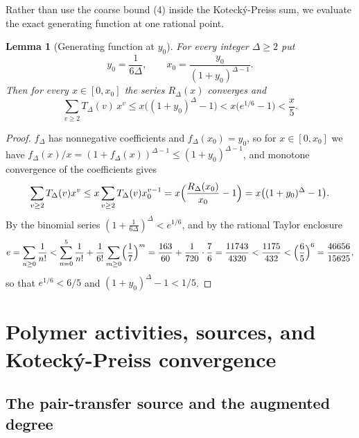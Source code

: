 \documentclass[11pt]{article}
\theoremstyle{plain}
\newtheorem{lemma}{Lemma}
\theoremstyle{definition}
\begin{document}
Rather than use the coarse bound (4) inside the Koteck\'y-Preiss sum, we evaluate the
exact generating function at one rational point.

\begin{lemma}[Generating function at $y_0$]\label{lem:gf}
For every integer $\Delta\ge2$ put
\begin{equation}\label{eq:y0}
 y_0=\frac{1}{6\Delta},\qquad x_0=\frac{y_0}{(1+y_0)^{\Delta-1}} .
\end{equation}
Then for every $x\in[0,x_0]$ the series $R_\Delta(x)$ converges and
\begin{equation}\label{eq:gfbound}
 \sum_{v\ge2}T_\Delta(v)\,x^v\le x\bigl((1+y_0)^\Delta-1\bigr)
 <x\bigl(e^{1/6}-1\bigr)<\frac x5 .
\end{equation}
\end{lemma}

\begin{proof}
$f_\Delta$ has nonnegative coefficients and $f_\Delta(x_0)=y_0$, so for
$x\in[0,x_0]$ we have $f_\Delta(x)/x=(1+f_\Delta(x))^{\Delta-1}\le(1+y_0)^{\Delta-1}$,
and monotone convergence of the coefficients gives
\[
 \sum_{v\ge2}T_\Delta(v)x^v
 \le x\sum_{v\ge2}T_\Delta(v)x_0^{v-1}
 =x\Bigl(\frac{R_\Delta(x_0)}{x_0}-1\Bigr)=x\bigl((1+y_0)^\Delta-1\bigr).
\]
By the binomial series $(1+\frac1{6\Delta})^\Delta<e^{1/6}$, and by the rational
Taylor enclosure
\begin{equation}\label{eq:eenc}
 e=\sum_{n\ge0}\frac1{n!}
 <\sum_{n=0}^5\frac1{n!}+\frac1{6!}\sum_{m\ge0}\Bigl(\frac17\Bigr)^m
 =\frac{163}{60}+\frac1{720}\cdot\frac76=\frac{11743}{4320}<\frac{1175}{432}
 <\Bigl(\frac65\Bigr)^6=\frac{46656}{15625},
\end{equation}
so that $e^{1/6}<6/5$ and $(1+y_0)^\Delta-1<1/5$.
\end{proof}

\section{Polymer activities, sources, and Koteck\'y-Preiss convergence}\label{sec:kp}

\subsection{The pair-transfer source and the augmented degree}
\end{document}
